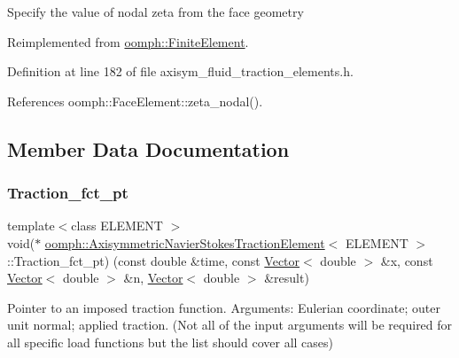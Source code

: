 Specify the value of nodal zeta from the face geometry 

Reimplemented from \hyperlink{classoomph_1_1FiniteElement_a849561c5fbcbc07dc49d2dc6cca68559}{oomph\+::\+Finite\+Element}.



Definition at line 182 of file axisym\+\_\+fluid\+\_\+traction\+\_\+elements.\+h.



References oomph\+::\+Face\+Element\+::zeta\+\_\+nodal().



\subsection{Member Data Documentation}
\mbox{\label{classoomph_1_1AxisymmetricNavierStokesTractionElement_a58840e83c766a6e7d653f389c2c54dfc}} 
\subsubsection{\texorpdfstring{Traction\+\_\+fct\+\_\+pt}{Traction\_fct\_pt}}
{\footnotesize\ttfamily template$<$class E\+L\+E\+M\+E\+NT $>$ \\
void($\ast$ \hyperlink{classoomph_1_1AxisymmetricNavierStokesTractionElement}{oomph\+::\+Axisymmetric\+Navier\+Stokes\+Traction\+Element}$<$ E\+L\+E\+M\+E\+NT $>$\+::Traction\+\_\+fct\+\_\+pt) (const double \&time, const \hyperlink{classoomph_1_1Vector}{Vector}$<$ double $>$ \&x, const \hyperlink{classoomph_1_1Vector}{Vector}$<$ double $>$ \&n, \hyperlink{classoomph_1_1Vector}{Vector}$<$ double $>$ \&result)\hspace{0.3cm}{\ttfamily [protected]}}



Pointer to an imposed traction function. Arguments\+: Eulerian coordinate; outer unit normal; applied traction. (Not all of the input arguments will be required for all specific load functions but the list should cover all cases) 



